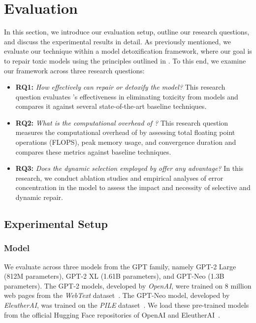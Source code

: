 \section{Evaluation}
\label{sec:evaluation}

In this section, we introduce our evaluation setup, outline our research questions, and discuss the experimental results in detail. As previously mentioned, we evaluate our technique within a model detoxification framework, where our goal is to repair toxic models using the principles outlined in \nick. To this end, we examine our framework across three research questions:

\begin{itemize} 
    \item \textbf{RQ1:} \textit{How effectively can \nick repair or detoxify the model?} This research question evaluates \nick's effectiveness in eliminating toxicity from models and compares it against several state-of-the-art baseline techniques.

    \item \textbf{RQ2:} \textit{What is the computational overhead of \nick?} This research question measures the computational overhead of \nick by assessing total floating point operations (FLOPS), peak memory usage, and convergence duration and compares these metrics against baseline techniques.
    
    \item \textbf{RQ3:} \textit{Does the dynamic selection employed by \nick offer any advantage?} In this research, we conduct ablation studies and empirical analyses of error concentration in the model to assess the impact and necessity of selective and dynamic repair.
\end{itemize}


\subsection{Experimental Setup}

\subsubsection{Model}
\label{sec:model}

We evaluate \nick across three models from the GPT family, namely GPT-2 Large (812M parameters), GPT-2 XL (1.61B parameters), and GPT-Neo (1.3B parameters). The GPT-2 models, developed by \textit{OpenAI}, were trained on 8 million web pages from the \textit{WebText} dataset~\cite{radford2019language}. The GPT-Neo model, developed by \textit{EleutherAI}, was trained on the \textit{PILE} dataset~\cite{gptneo}. 
We load these pre-trained models from the official Hugging Face repositories of OpenAI and EleutherAI~\cite{gptneohf,gpthf}.


